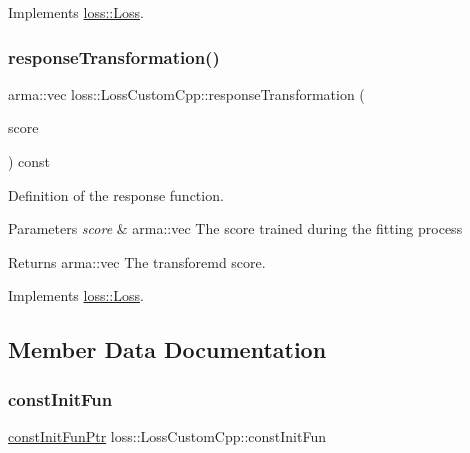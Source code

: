 Implements \mbox{\hyperlink{classloss_1_1_loss_ae9f94dd9b8311397583ba3a9cb485e94}{loss\+::\+Loss}}.

\mbox{\label{classloss_1_1_loss_custom_cpp_ace7a23f6b0da58d12f1dec29e26acf18}} 
\subsubsection{\texorpdfstring{response\+Transformation()}{responseTransformation()}}
{\footnotesize\ttfamily arma\+::vec loss\+::\+Loss\+Custom\+Cpp\+::response\+Transformation (\begin{DoxyParamCaption}\item[{const arma\+::vec \&}]{score }\end{DoxyParamCaption}) const\hspace{0.3cm}{\ttfamily [virtual]}}



Definition of the response function. 


\begin{DoxyParams}{Parameters}
{\em score} & {\ttfamily arma\+::vec} The score trained during the fitting process\\
\hline
\end{DoxyParams}
\begin{DoxyReturn}{Returns}
{\ttfamily arma\+::vec} The transforemd score. 
\end{DoxyReturn}


Implements \mbox{\hyperlink{classloss_1_1_loss_a0a84b7df79b08e40b538aaa7e6ee75c4}{loss\+::\+Loss}}.



\subsection{Member Data Documentation}
\mbox{\label{classloss_1_1_loss_custom_cpp_a444ea8e5947d242cb774418cb0f3bc51}} 
\subsubsection{\texorpdfstring{const\+Init\+Fun}{constInitFun}}
{\footnotesize\ttfamily \mbox{\hyperlink{namespaceloss_af21a5d5ed7431ecbc73730ce2bde3987}{const\+Init\+Fun\+Ptr}} loss\+::\+Loss\+Custom\+Cpp\+::const\+Init\+Fun\hspace{0.3cm}{\ttfamily [private]}}



